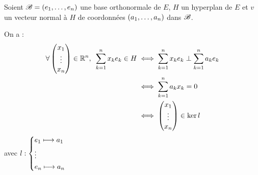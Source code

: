 \begin{dem}
Soient \(\fami{B}=\paren{e_1,\dots,e_n}\) une base orthonormale de \(E\), \(H\) un hyperplan de \(E\) et \(v\) un vecteur normal à \(H\) de coordonnées \(\paren{a_1,\dots,a_n}\) dans \(\fami{B}\).

On a : \[\begin{aligned}
\quantifs{\forall\tcoords{x_1}{\vdots}{x_n}\in\R^n}\sum_{k=1}^{n}x_ke_k\in H&\ssi\sum_{k=1}^{n}x_ke_k\perp\sum_{k=1}^{n}a_ke_k \\
&\ssi\sum_{k=1}^{n}a_kx_k=0 \\
&\ssi\tcoords{x_1}{\vdots}{x_n}\in\ker l
\end{aligned}\] avec \(l:\begin{dcases}
e_1\mapsto a_1 \\
\vdots \\
e_n\mapsto a_n
\end{dcases}\)
\end{dem}

